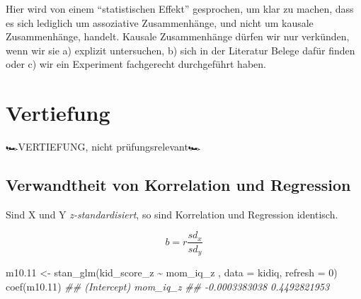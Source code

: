 \documentclass[
  a4paper,
  DIV=11]{scrreprt}
\newenvironment{Shaded}{\begin{snugshade}}{\end{snugshade}}
\newcommand{\AttributeTok}[1]{\textcolor[rgb]{0.40,0.45,0.13}{#1}}
\newcommand{\DecValTok}[1]{\textcolor[rgb]{0.68,0.00,0.00}{#1}}
\newcommand{\DocumentationTok}[1]{\textcolor[rgb]{0.37,0.37,0.37}{\textit{#1}}}
\newcommand{\FloatTok}[1]{\textcolor[rgb]{0.68,0.00,0.00}{#1}}
\newcommand{\FunctionTok}[1]{\textcolor[rgb]{0.28,0.35,0.67}{#1}}
\newcommand{\NormalTok}[1]{\textcolor[rgb]{0.00,0.23,0.31}{#1}}
\newcommand{\OtherTok}[1]{\textcolor[rgb]{0.00,0.23,0.31}{#1}}
\newcommand{\SpecialCharTok}[1]{\textcolor[rgb]{0.37,0.37,0.37}{#1}}
\theoremstyle{definition}
\theoremstyle{remark}
\begin{document}
\begin{tcolorbox}[enhanced jigsaw, leftrule=.75mm, toptitle=1mm, bottomtitle=1mm, titlerule=0mm, breakable, colframe=quarto-callout-important-color-frame, title=\textcolor{quarto-callout-important-color}{\faExclamation}\hspace{0.5em}{Wichtig}, rightrule=.15mm, colback=white, arc=.35mm, left=2mm, bottomrule=.15mm, coltitle=black, opacitybacktitle=0.6, toprule=.15mm, colbacktitle=quarto-callout-important-color!10!white, opacityback=0]
Hier wird von einem ``statistischen Effekt'' gesprochen, um klar zu
machen, dass es sich lediglich um assoziative Zusammenhänge, und nicht
um kausale Zusammenhänge, handelt. Kausale Zusammenhänge dürfen wir nur
verkünden, wenn wir sie a) explizit untersuchen, b) sich in der
Literatur Belege dafür finden oder c) wir ein Experiment fachgerecht
durchgeführt haben.
\end{tcolorbox}

\hypertarget{vertiefung-2}{%
\section{Vertiefung}\label{vertiefung-2}}

🏎️VERTIEFUNG, nicht prüfungsrelevant🏎️

\hypertarget{verwandtheit-von-korrelation-und-regression}{%
\subsection{Verwandtheit von Korrelation und
Regression}\label{verwandtheit-von-korrelation-und-regression}}

Sind X und Y \emph{z-standardisiert}, so sind Korrelation und Regression
identisch.

\[b = r \frac{sd_x}{sd_y}\]

\begin{Shaded}
\begin{Highlighting}[]
\NormalTok{m10}\FloatTok{.11} \OtherTok{\textless{}{-}} 
  \FunctionTok{stan\_glm}\NormalTok{(kid\_score\_z }\SpecialCharTok{\textasciitilde{}}\NormalTok{ mom\_iq\_z , }\AttributeTok{data =}\NormalTok{ kidiq, }\AttributeTok{refresh =} \DecValTok{0}\NormalTok{)}
\FunctionTok{coef}\NormalTok{(m10}\FloatTok{.11}\NormalTok{)}
\DocumentationTok{\#\#   (Intercept)      mom\_iq\_z }
\DocumentationTok{\#\# {-}0.0003383038  0.4492821953}
\end{Highlighting}
\end{Shaded}
\end{document}
